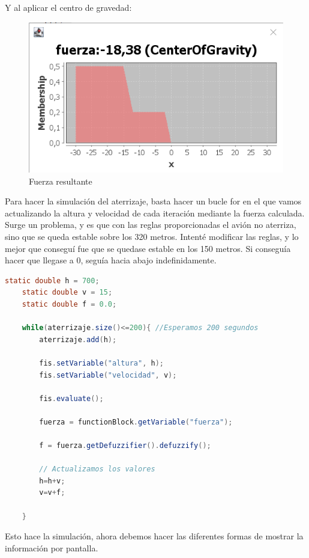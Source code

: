 \documentclass[
]{article}
\begin{document}
Y al aplicar el centro de gravedad:

\begin{figure}
\centering
\includegraphics{pegado1.png}
\caption{Fuerza resultante}
\end{figure}

Para hacer la simulación del aterrizaje, basta hacer un bucle for en el
que vamos actualizando la altura y velocidad de cada iteración mediante
la fuerza calculada. Surge un problema, y es que con las reglas
proporcionadas el avión no aterriza, sino que se queda estable sobre los
320 metros. Intenté modificar las reglas, y lo mejor que conseguí fue
que se quedase estable en los 150 metros. Si conseguía hacer que llegase
a 0, seguía hacia abajo indefinidamente.

\begin{lstlisting}[language=Java, caption=Bucle para la simulación]
  static double h = 700;
    static double v = 15;
    static double f = 0.0;
    
    while(aterrizaje.size()<=200){ //Esperamos 200 segundos
        aterrizaje.add(h);
        
        fis.setVariable("altura", h);
        fis.setVariable("velocidad", v);
        
        fis.evaluate();
        
        fuerza = functionBlock.getVariable("fuerza");
        
        f = fuerza.getDefuzzifier().defuzzify();
        
        // Actualizamos los valores
        h=h+v;
        v=v+f;
        
    }
\end{lstlisting}

Esto hace la simulación, ahora debemos hacer las diferentes formas de
mostrar la información por pantalla.
\end{document}
